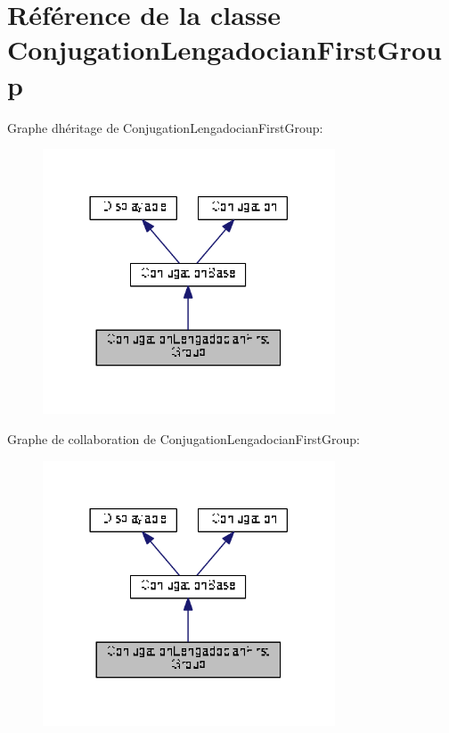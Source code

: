 \hypertarget{class_conjugation_lengadocian_first_group}{}\section{Référence de la classe Conjugation\+Lengadocian\+First\+Group}
\label{class_conjugation_lengadocian_first_group}


Graphe d\textquotesingle{}héritage de Conjugation\+Lengadocian\+First\+Group\+:
\nopagebreak
\begin{figure}[H]
\begin{center}
\leavevmode
\includegraphics[width=246pt]{class_conjugation_lengadocian_first_group__inherit__graph}
\end{center}
\end{figure}


Graphe de collaboration de Conjugation\+Lengadocian\+First\+Group\+:
\nopagebreak
\begin{figure}[H]
\begin{center}
\leavevmode
\includegraphics[width=246pt]{class_conjugation_lengadocian_first_group__coll__graph}
\end{center}
\end{figure}
